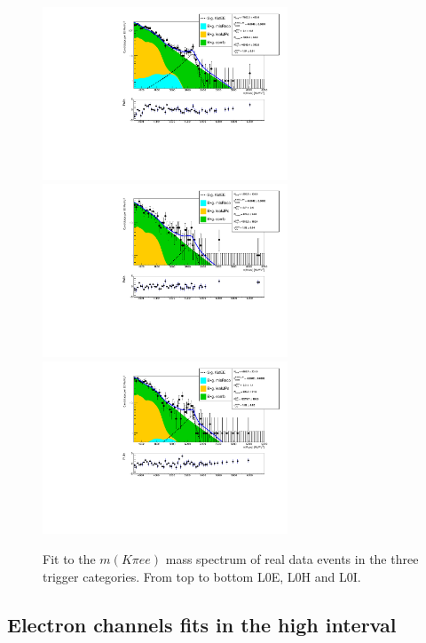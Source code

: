 %
\begin{figure}[h!]
\centering
\includegraphics[width=0.65\textwidth]{RKst/figs/fit_EEs_0_EE-q2central-gmc/KstEE_L0E_log_fitAndRes.pdf}
\includegraphics[width=0.65\textwidth]{RKst/figs/fit_EEs_0_EE-q2central-gmc/KstEE_L0H_log_fitAndRes.pdf}
\includegraphics[width=0.65\textwidth]{RKst/figs/fit_EEs_0_EE-q2central-gmc/KstEE_L0I_log_fitAndRes.pdf}
\caption{Fit to the $m(K\pi ee)$ mass spectrum of \BdKstee real data events in the three trigger categories.
From top to bottom L0E, L0H and L0I.
}
\label{fig:FitEE_Data_inTrigCat}
\end{figure}


\subsection{Electron channels fits in the high \qsq interval}

